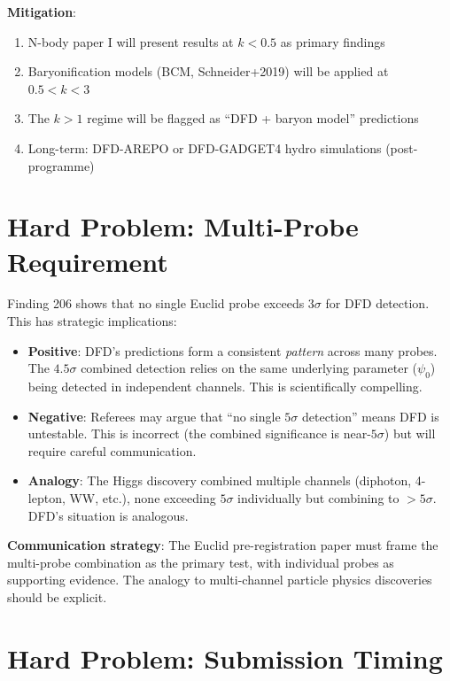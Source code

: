 \documentclass[11pt,a4paper]{article}
\begin{document}
\textbf{Mitigation}:
\begin{enumerate}[nosep]
\item N-body paper I will present results at $k < 0.5$ as primary findings
\item Baryonification models (BCM, Schneider+2019) will be applied at $0.5 < k < 3$
\item The $k > 1$ regime will be flagged as ``DFD + baryon model'' predictions
\item Long-term: DFD-AREPO or DFD-GADGET4 hydro simulations (post-programme)
\end{enumerate}

\section{Hard Problem: Multi-Probe Requirement}

Finding 206 shows that no single Euclid probe exceeds $3\sigma$ for DFD detection. This has strategic implications:

\begin{itemize}[nosep]
\item \textbf{Positive}: DFD's predictions form a consistent \emph{pattern} across many probes. The $4.5\sigma$ combined detection relies on the same underlying parameter ($\psi_0$) being detected in independent channels. This is scientifically compelling.

\item \textbf{Negative}: Referees may argue that ``no single $5\sigma$ detection'' means DFD is untestable. This is incorrect (the combined significance is near-$5\sigma$) but will require careful communication.

\item \textbf{Analogy}: The Higgs discovery combined multiple channels (diphoton, 4-lepton, WW, etc.), none exceeding $5\sigma$ individually but combining to $> 5\sigma$. DFD's situation is analogous.
\end{itemize}

\textbf{Communication strategy}: The Euclid pre-registration paper must frame the multi-probe combination as the primary test, with individual probes as supporting evidence. The analogy to multi-channel particle physics discoveries should be explicit.

\section{Hard Problem: Submission Timing}
\end{document}
